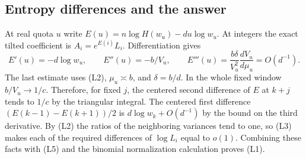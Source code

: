 \subsection{Entropy differences and the answer}

At real quota $u$ write $E(u)=n\log H(w_u)-du\log w_u$.
At integers the exact tilted coefficient is $A_i=e^{E(i)}L_i$.
Differentiation gives
\begin{equation*}
E'(u)=-d\log w_u,\qquad E''(u)=-b/V_u,\qquad
E'''(u)=\frac{b\delta}{V_u^2}\frac{dV_u}{d\mu_u}=O(d^{-1}).
\end{equation*}
The last estimate uses (L2), $\mu_u\asymp b$, and $\delta=b/d$.
In the whole fixed window $b/V_u\to1/c$. Therefore, for fixed $j$,
the centered second difference of $E$ at $k+j$ tends to $1/c$
by the triangular integral. The centered first difference
$(E(k-1)-E(k+1))/2$ is $d\log w_k+O(d^{-1})$ by the bound on
the third derivative. By (L2) the ratios of the neighboring
variances tend to one, so (L3) makes each of the required
differences of $\log L_i$ equal to $o(1)$. Combining these
facts with (L5) and the binomial normalization calculation
proves (L1).
